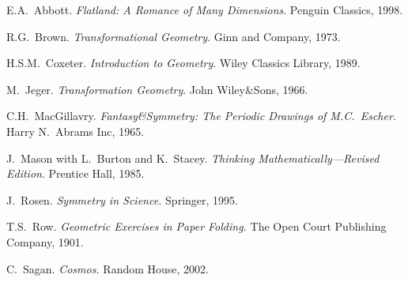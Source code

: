 \begin{thebibliography}{99}

 E.A.\ Abbott. \emph{Flatland: A Romance of Many Dimensions}. Penguin Classics, 1998.


 R.G.\ Brown. \emph{Transformational Geometry}. Ginn and Company, 1973.


 H.S.M.\ Coxeter. \emph{Introduction to Geometry}. Wiley Classics Library, 1989.

 M.\ Jeger. \emph{Transformation Geometry}. John Wiley\&Sons, 1966.

 C.H.\ MacGillavry. \emph{Fantasy\&Symmetry: The Periodic Drawings of M.C.\ Escher.} Harry N.\ Abrams Inc, 1965.

 J.\ Mason with L.\ Burton and K.\ Stacey. \emph{Thinking Mathematically---Revised Edition}. Prentice Hall, 1985.

 J.\ Rosen. \emph{Symmetry in Science.} Springer, 1995.

 T.S.\ Row. \emph{Geometric Exercises in Paper Folding.} The Open Court Publishing Company, 1901.

 C.\ Sagan. \emph{Cosmos.} Random House, 2002.

\end{thebibliography}


\printindex
